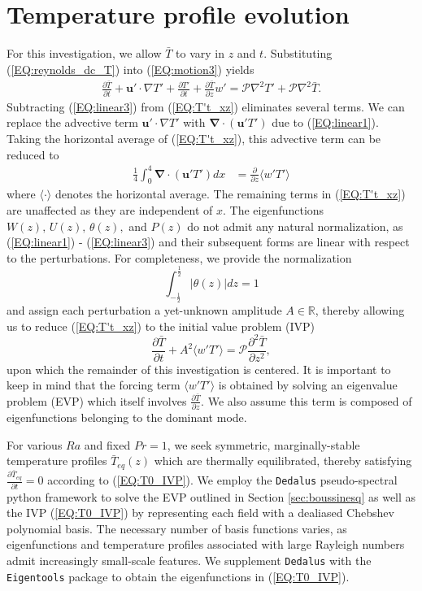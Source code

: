 \documentclass[reprint,amsmath,amssymb,aps]{revtex4-1}
\renewcommand{\vec}[1]{\boldsymbol{#1}}
\newcommand{\grad}{\vec{\nabla}}
\begin{document}
\section{Temperature profile evolution}\label{sec:evolution}
For this investigation, we allow $ \bar{T}$ to vary in $z$ and $t$. Substituting (\ref{EQ:reynolds_dc_T}) into (\ref{EQ:motion3}) yields
\begin{align}
    \frac{\partial \bar{T}}{\partial t} + \mathbf{u}' \cdot \nabla T' + \frac{\partial T'}{\partial t} + \frac{\partial \bar{T}}{\partial z} w' = \mathcal{P} \nabla^2 T' + \mathcal{P} \nabla^2 \bar{T}.
    \label{EQ:T't_xz}
\end{align}
Subtracting (\ref{EQ:linear3}) from (\ref{EQ:T't_xz}) eliminates several terms. We can replace the advective term $\mathbf{u}' \cdot \nabla T'$ with $\grad \cdot (\mathbf{u}'T')$ due to (\ref{EQ:linear1}). Taking the horizontal average of (\ref{EQ:T't_xz}), this advective term can be reduced to
\begin{align}
    \frac{1}{4}\int_0^4 \grad \cdot (\mathbf{u}'T') dx &= \frac{\partial }{\partial z}  \langle w'T' \rangle
\end{align}
where $\langle \cdot \rangle$ denotes the horizontal average. The remaining terms in (\ref{EQ:T't_xz}) are unaffected as they are independent of $x$. The eigenfunctions $W(z),\, U(z),\, \theta(z),$ and $P(z)$ do not admit any natural normalization, as (\ref{EQ:linear1}) - (\ref{EQ:linear3}) and their subsequent forms are linear with respect to the perturbations. For completeness, we provide the normalization 
\begin{equation}
    \int_{-\frac{1}{2}}^{\frac{1}{2}} \big| \theta (z) \big| dz = 1
\end{equation}
and assign each perturbation a yet-unknown amplitude $A \in \mathbb{R}$, thereby allowing us to reduce (\ref{EQ:T't_xz}) to the initial value problem (IVP)
\begin{equation}
    \frac{\partial \bar{T}}{\partial t} + A^2 \langle w'T' \rangle = \mathcal{P}  \frac{\partial^2 \bar{T}}{\partial z^2}, \label{EQ:T0_IVP}
\end{equation}
upon which the remainder of this investigation is centered. It is important to keep in mind that the forcing term $\langle w'T' \rangle$ is obtained by solving an eigenvalue problem (EVP) which itself involves $\frac{\partial \bar{T}}{\partial z}$. We also assume this term is composed of eigenfunctions belonging to the dominant mode. 
\par For various $Ra$ and fixed $Pr = 1$, we seek symmetric, marginally-stable temperature profiles $\bar{T}_{eq}(z)$ which are thermally equilibrated, thereby satisfying $\frac{\partial \bar{T}_{eq}}{\partial t} = 0$ according to (\ref{EQ:T0_IVP}). We employ the \texttt{Dedalus} pseudo-spectral python framework to solve the EVP outlined in Section \ref{sec:boussinesq} as well as the IVP (\ref{EQ:T0_IVP}) by representing each field with a dealiased Chebshev polynomial basis. The necessary number of basis functions varies, as eigenfunctions and temperature profiles associated with large Rayleigh numbers admit increasingly small-scale features. We supplement \texttt{Dedalus} with the \texttt{Eigentools} package to obtain the eigenfunctions in (\ref{EQ:T0_IVP}).
\end{document}
